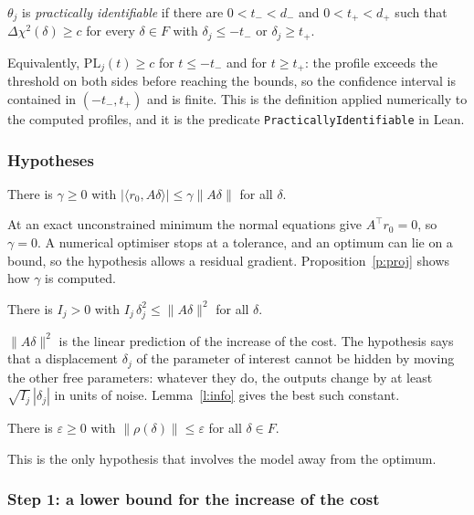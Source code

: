 \begin{sdefinition}
$\theta_j$ is \emph{practically identifiable} if there are $0<t_-<d_-$ and $0<t_+<d_+$ such that $\Delta\chi^2(\delta)\ge c$ for every $\delta\in F$ with $\delta_j\le -t_-$ or $\delta_j\ge t_+$.
\end{sdefinition}
Equivalently, $\mathrm{PL}_j(t)\ge c$ for $t\le-t_-$ and for $t\ge t_+$: the profile exceeds the threshold on both sides before reaching the bounds, so the confidence interval is contained in $(-t_-,t_+)$ and is finite. This is the definition applied numerically to the computed profiles, and it is the predicate \texttt{PracticallyIdentifiable} in Lean.

\subsubsection*{Hypotheses}

\begin{shypothesis}\label{h:stat}
There is $\gamma\ge0$ with $|\langle r_0,A\delta\rangle|\le\gamma\|A\delta\|$ for all $\delta$.
\end{shypothesis}
At an exact unconstrained minimum the normal equations give $A^{\top}r_0=0$, so $\gamma=0$. A numerical optimiser stops at a tolerance, and an optimum can lie on a bound, so the hypothesis allows a residual gradient. Proposition~\ref{p:proj} shows how $\gamma$ is computed.

\begin{shypothesis}\label{h:info}
There is $I_j>0$ with $I_j\,\delta_j^2\le\|A\delta\|^2$ for all $\delta$.
\end{shypothesis}
$\|A\delta\|^2$ is the linear prediction of the increase of the cost. The hypothesis says that a displacement $\delta_j$ of the parameter of interest cannot be hidden by moving the other free parameters: whatever they do, the outputs change by at least $\sqrt{I_j}\,|\delta_j|$ in units of noise. Lemma~\ref{l:info} gives the best such constant.

\begin{shypothesis}\label{h:rem}
There is $\varepsilon\ge0$ with $\|\rho(\delta)\|\le\varepsilon$ for all $\delta\in F$.
\end{shypothesis}
This is the only hypothesis that involves the model away from the optimum.

\subsubsection*{Step 1: a lower bound for the increase of the cost}

